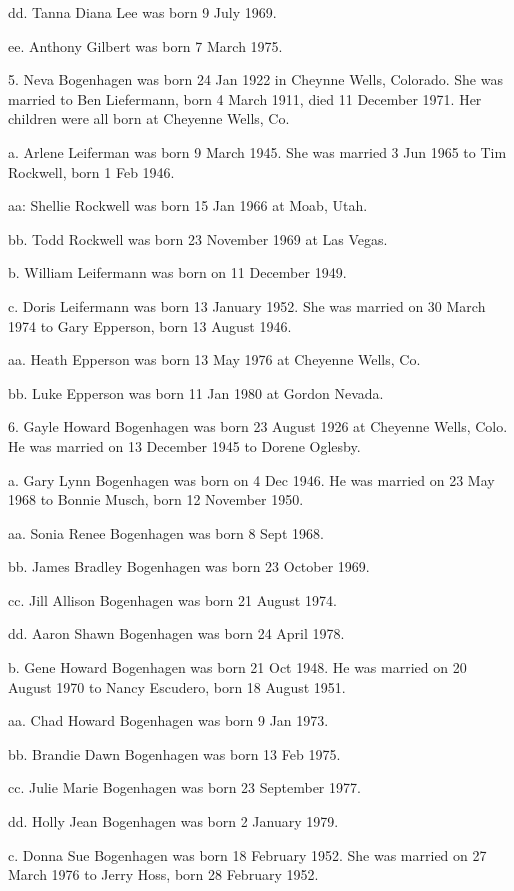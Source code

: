 \documentclass[a4paper]{article}
\begin{document}
dd. Tanna Diana Lee was born 9 July 1969.

ee. Anthony Gilbert was born 7 March 1975.

5. Neva Bogenhagen was born 24 Jan 1922 in Cheynne Wells, Colorado.  She was married to Ben Liefermann, born 4 March 1911, died 11 December 1971. Her children were all born at Cheyenne Wells, Co.

a. Arlene Leiferman was born 9 March 1945.  She was married 3 Jun 1965 to Tim Rockwell, born 1 Feb 1946.

aa: Shellie Rockwell was born 15 Jan 1966 at Moab, Utah.

bb. Todd Rockwell was born 23 November 1969 at Las Vegas.

b. William Leifermann was born on 11 December 1949.

c. Doris Leifermann was born 13 January 1952.  She was married on 30 March 1974 to Gary Epperson, born 13 August 1946. 

aa. Heath Epperson was born 13 May 1976 at Cheyenne Wells, Co.

bb. Luke Epperson was born 11 Jan 1980 at Gordon Nevada.

6. Gayle Howard Bogenhagen was born 23 August 1926 at Cheyenne Wells, Colo.  He was married on 13 December 1945 to Dorene Oglesby. 

a. Gary Lynn Bogenhagen was born on 4 Dec 1946. He was married on  23 May 1968 to Bonnie Musch, born 12 November 1950. 

aa. Sonia Renee Bogenhagen was born 8 Sept 1968.

bb. James Bradley Bogenhagen was born 23 October 1969. 

cc. Jill Allison Bogenhagen was born 21 August 1974.

dd. Aaron Shawn Bogenhagen was born 24 April 1978.
			
b. Gene Howard Bogenhagen was born 21 Oct 1948.  He was married on 20 August 1970 to Nancy Escudero, born 18 August 1951.

aa. Chad Howard Bogenhagen was born 9 Jan 1973.

bb. Brandie Dawn Bogenhagen was born 13 Feb 1975.

cc. Julie Marie Bogenhagen was born 23 September 1977.

dd. Holly Jean Bogenhagen was born 2 January 1979.

c. Donna Sue Bogenhagen was born 18 February 1952.  She was married on 27 March 1976 to Jerry Hoss, born 28 February 1952.
\end{document}

